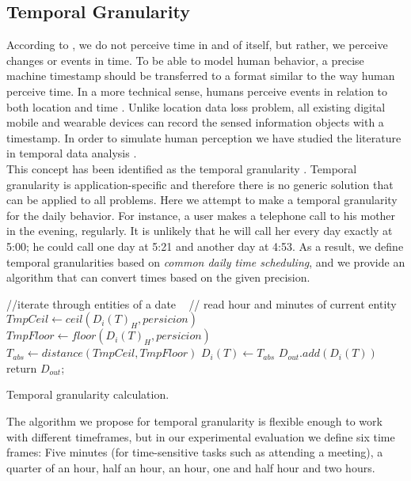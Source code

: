 \documentclass{sig-alternate}
\begin{document}
\subsection{Temporal Granularity}
According to \cite{time}, we do not perceive time in and of itself, but rather, we perceive changes or events in time. To be able to model human behavior, a precise machine timestamp should be transferred to a format similar to the way human perceive time. In a more technical sense, humans perceive events in relation to both location and time \cite{towsharing}. Unlike location data loss problem, all existing digital mobile and wearable devices can record the sensed information objects with a timestamp. In order to simulate human perception we have studied the literature in temporal data analysis \cite{encydb}. \\
This concept has been identified as the temporal granularity \cite{tempgran}. Temporal granularity is application-specific and therefore there is no generic solution that can be applied to all problems. Here we attempt to make a temporal granularity for the daily behavior. For instance, a user makes a telephone call to his mother in the evening, regularly. It is unlikely that he will call her every day exactly at 5:00; he could call  one day at 5:21 and another day at 4:53. As a result, we define temporal granularities based on \emph{common daily time scheduling}, and we provide an algorithm that can convert times based on the given precision. \\
\begin{algorithm2e}[h]
\scriptsize
  //iterate through entities of a date \
   { 
    // read hour and minutes of current entity \\
	 $TmpCeil \gets ceil(D_{i}(T)_{H},persicion) $ \;
	 $TmpFloor \gets floor(D_{i}(T)_{H},persicion) $ \;
	 $ T_{abs}  \gets distance(TmpCeil, TmpFloor)$ \;
	 $D_{i}(T) \gets T_{abs} $ \;
	 $D_{out}.add(D_{i}(T))$   	
   	}
  return $D_{out}$;
	\caption{\footnotesize Temporal granularity calculation.}\label{alg:tempgran}
\end{algorithm2e}
\normalsize
The algorithm we propose for temporal granularity is flexible enough to work with different timeframes, but in our experimental evaluation we define six time frames: Five minutes (for time-sensitive tasks such as attending a meeting), a quarter of an hour, half an hour, an hour, one and half hour and two hours. \\
\end{document}
